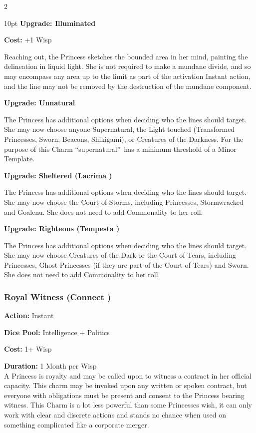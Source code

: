 \begin{multicols}{2}
\begin{myindentpar}{10pt}
\textbf{Upgrade: Illuminated}

\noindent \textbf{Cost:} +1 Wisp

Reaching out, the Princess sketches the bounded area in her mind, painting the delineation in liquid light. She is not required to make a mundane divide, and so may encompass any area up to the limit as part of the activation Instant action, and the line may not be removed by the destruction of the mundane component. 

\textbf{Upgrade: Unnatural}

The Princess has additional options when deciding who the lines should target. She may now choose anyone Supernatural, the Light touched (Transformed Princesses, Sworn, Beacons, Shikigami), or Creatures of the Darkness. For the purpose of this Charm \textquotedblleft supernatural\textquotedblright\, has a minimum threshold of a Minor Template.

\textbf{Upgrade: Sheltered (Lacrima \textbullet)}

The Princess has additional options when deciding who the lines should target. She may now choose the Court of Storms, including Princesses, Stormwracked and Goalenu. She does not need to add Commonality to her roll. 

\textbf{Upgrade: Righteous (Tempesta \textbullet)}

The Princess has additional options when deciding who the lines should target. She may now choose Creatures of the Dark or the Court of Tears, including Princesses, Ghost Princesses (if they are part of the Court of Tears) and Sworn. She does not need to add Commonality to her roll. 

\end{myindentpar}

\subsubsection*{Royal Witness (Connect \textbullet)}

\noindent \textbf{Action:} Instant

\noindent \textbf{Dice Pool:} Intelligence + Politics

\noindent \textbf{Cost:} 1+ Wisp

\noindent \textbf{Duration:} 1 Month per Wisp \\

A Princess is royalty and may be called upon to witness a contract in her official capacity. This charm may be invoked upon any written or spoken contract, but everyone with obligations must be present and consent to the Princess bearing witness. This Charm is a lot less powerful than some Princesses wish, it can only work with clear and discrete actions and stands no chance when used on something complicated like a corporate merger.


\end{multicols}
